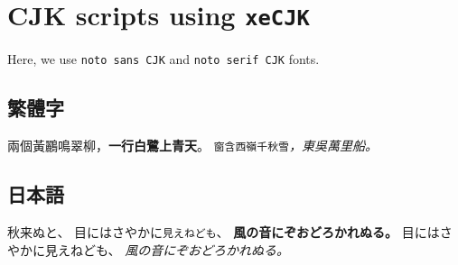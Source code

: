 \documentclass{article}
\numberwithin{equation}{section} %
\begin{document}
\section{CJK scripts using \texttt{xeCJK}}
Here, we use \texttt{noto sans CJK} and \texttt{noto serif CJK} fonts.
\subsection{繁體字}
兩個黃鸝\textsf{鳴翠柳}，\textbf{一行白鷺上青天}。
\texttt{窗含西嶺千秋雪}\textit{，東吳萬里船。}

{%
	\subsection{日本語}
	秋来ぬと、
	目にはさやかに\texttt{見えねども}、
	\textbf{風の音にぞおどろかれぬる。}
	目にはさやかに\textsf{見えねども}、
	\textit{風の音にぞおどろかれぬる。}
}

\end{document}

